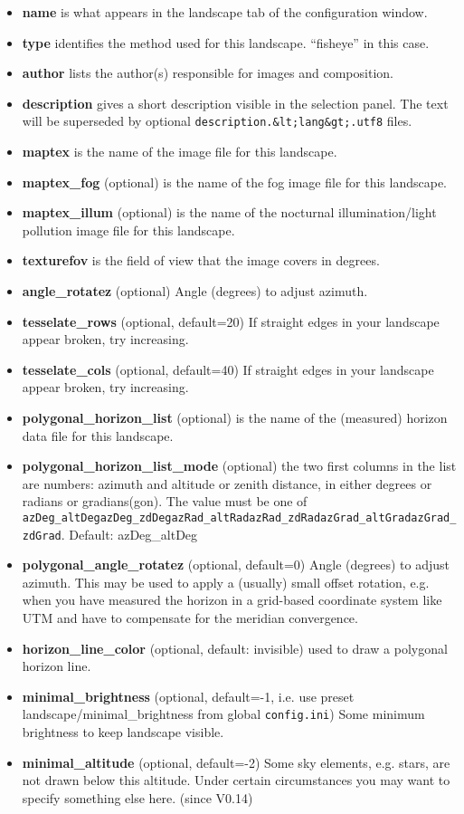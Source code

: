 \begin{itemize}
\item
  \textbf{name} is what appears in the landscape tab of the
  configuration window.
\item
  \textbf{type} identifies the method used for this landscape.
  ``fisheye'' in this case.
\item
  \textbf{author} lists the author(s) responsible for images and
  composition.
\item
  \textbf{description} gives a short description visible in the
  selection panel. The text will be superseded by optional
  \texttt{description.\&lt;lang\&gt;.utf8} files.
\item
  \textbf{maptex} is the name of the image file for this landscape.
\item
  \textbf{maptex\_fog} (optional) is the name of the fog image file for
  this landscape.
\item
  \textbf{maptex\_illum} (optional) is the name of the nocturnal
  illumination/light pollution image file for this landscape.
\item
  \textbf{texturefov} is the field of view that the image covers in
  degrees.
\item
  \textbf{angle\_rotatez} (optional) Angle (degrees) to adjust azimuth.
\item
  \textbf{tesselate\_rows} (optional, default=20) If straight edges in
  your landscape appear broken, try increasing.
\item
  \textbf{tesselate\_cols} (optional, default=40) If straight edges in
  your landscape appear broken, try increasing.
\item
  \textbf{polygonal\_horizon\_list} (optional) is the name of the
  (measured) horizon data file for this landscape.
\item
  \textbf{polygonal\_horizon\_list\_mode} (optional) the two first
  columns in the list are numbers: azimuth and altitude or zenith
  distance, in either degrees or radians or gradians(gon). The value
  must be one of
  \texttt{azDeg\_altDeg\textbar{}azDeg\_zdDeg\textbar{}azRad\_altRad\textbar{}azRad\_zdRad\textbar{}azGrad\_altGrad\textbar{}azGrad\_zdGrad}.
  Default: azDeg\_altDeg
\item
  \textbf{polygonal\_angle\_rotatez} (optional, default=0) Angle
  (degrees) to adjust azimuth. This may be used to apply a (usually)
  small offset rotation, e.g. when you have measured the horizon in a
  grid-based coordinate system like UTM and have to compensate for the
  meridian convergence.
\item
  \textbf{horizon\_line\_color} (optional, default: invisible) used to
  draw a polygonal horizon line.
\item
  \textbf{minimal\_brightness} (optional, default=-1, i.e. use preset
  landscape/minimal\_brightness from global \texttt{config.ini}) Some
  minimum brightness to keep landscape visible.
\item
  \textbf{minimal\_altitude} (optional, default=-2) Some sky elements,
  e.g. stars, are not drawn below this altitude. Under certain
  circumstances you may want to specify something else here. (since
  V0.14)
\end{itemize}

